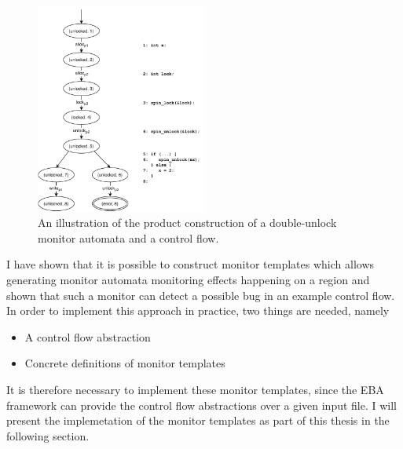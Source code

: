 \begin{figure}[H]
    \centering
    \includegraphics[width=0.5\textwidth]{algorithm/figures/cfg_unlock-product}
    \caption{An illustration of the product construction of a double-unlock monitor automata and a control flow.}
    \label{cfg_unlock-product}
\end{figure}

\newpar I have shown that it is possible to construct monitor templates which allows generating monitor automata monitoring effects happening on a region and shown that such a monitor can detect a possible bug in an example control flow. In order to implement this approach in practice, two things are needed, namely

\begin{itemize}
    \item A control flow abstraction
    \item Concrete definitions of monitor templates
\end{itemize}

\noindent It is therefore necessary to implement these monitor templates, since the EBA framework can provide the control flow abstractions over a given input file. I will present the implemetation of the monitor templates as part of this thesis in the following section. 